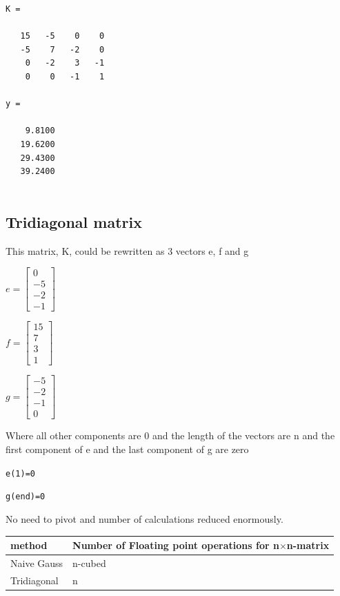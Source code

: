 \documentclass[11pt]{article}
\begin{document}
    \begin{Verbatim}[commandchars=\\\{\}]
K =

   15   -5    0    0
   -5    7   -2    0
    0   -2    3   -1
    0    0   -1    1

y =

    9.8100
   19.6200
   29.4300
   39.2400


    \end{Verbatim}

    \subsection{Tridiagonal matrix}\label{tridiagonal-matrix}

This matrix, K, could be rewritten as 3 vectors e, f and g

\(e=\left[ \begin{array}{c} 0 \\ -5 \\ -2 \\ -1 \end{array} \right]\)

\(f=\left[ \begin{array}{c} 15 \\ 7 \\ 3 \\ 1 \end{array} \right]\)

\(g=\left[ \begin{array}{c} -5 \\ -2 \\ -1 \\ 0 \end{array} \right]\)

Where all other components are 0 and the length of the vectors are n and
the first component of e and the last component of g are zero

\texttt{e(1)=0}

\texttt{g(end)=0}

No need to pivot and number of calculations reduced enormously.

\begin{longtable}[c]{@{}ll@{}}
\toprule
method & Number of Floating point operations for
n\(\times\)n-matrix\tabularnewline
\midrule
\endhead
Naive Gauss & n-cubed\tabularnewline
Tridiagonal & n\tabularnewline
\bottomrule
\end{longtable}
\end{document}
